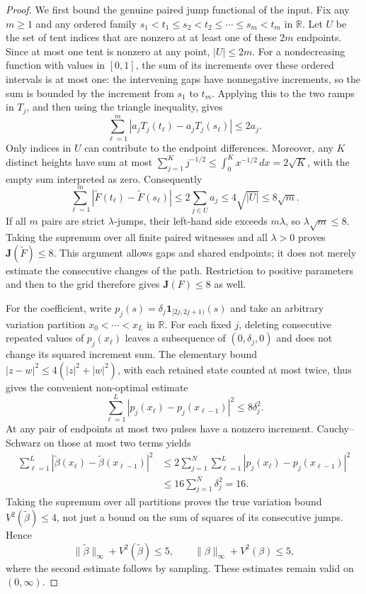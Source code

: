 \documentclass[11pt]{article}
\numberwithin{equation}{section}
\theoremstyle{remark}
\theoremstyle{definition}
\begin{document}
\begin{proof}
We first bound the genuine paired jump functional of the input.
Fix any $m\ge1$ and any ordered family
$s_1<t_1\le s_2<t_2\le\cdots\le s_m<t_m$ in $\mathbb R$.
Let $U$ be the set of tent indices that are nonzero at at least one of
these $2m$ endpoints.  Since at most one tent is nonzero at any point,
$|U|\le2m$.  For a nondecreasing function with values in $[0,1]$,
the sum of its increments over these ordered intervals is at most one:
the intervening gaps have nonnegative increments, so the sum is bounded
by the increment from $s_1$ to $t_m$.  Applying this to the two ramps in
$T_j$, and then using the triangle inequality, gives
\[
 \sum_{\ell=1}^m
 |a_jT_j(t_\ell)-a_jT_j(s_\ell)|\le2a_j.
\]
Only indices in $U$ can contribute to the endpoint differences.
Moreover, any $K$ distinct heights have sum at most
$\sum_{j=1}^Kj^{-1/2}\le\int_0^Kx^{-1/2}\,dx=2\sqrt K$,
with the empty sum interpreted as zero.  Consequently
\[
 \sum_{\ell=1}^m
 |\widetilde F(t_\ell)-\widetilde F(s_\ell)|
 \le2\sum_{j\in U}a_j
 \le4\sqrt{|U|}\le8\sqrt m.
\]
If all $m$ pairs are strict $\lambda$-jumps, their left-hand side
exceeds $m\lambda$, so $\lambda\sqrt m\le8$.
Taking the supremum over all finite paired witnesses and all
$\lambda>0$ proves $\mathbf J(\widetilde F)\le8$.
This argument allows gaps and shared endpoints; it does not merely
estimate the consecutive changes of the path.  Restriction to positive
parameters and then to the grid therefore gives $\mathbf J(F)\le8$
as well.

For the coefficient, write
$p_j(s)=\delta_j\mathbf1_{[2j,2j+1)}(s)$ and take an arbitrary
variation partition $x_0<\cdots<x_L$ in $\mathbb R$.
For each fixed $j$, deleting consecutive repeated values of
$p_j(x_\ell)$ leaves a subsequence of $(0,\delta_j,0)$ and does
not change its squared increment sum.  The elementary bound
$|z-w|^2\le4(|z|^2+|w|^2)$, with each retained state counted at
most twice, thus gives the convenient non-optimal estimate
\[
 \sum_{\ell=1}^L
 |p_j(x_\ell)-p_j(x_{\ell-1})|^2\le8\delta_j^2.
\]
At any pair of endpoints at most two pulses have a nonzero
increment.  Cauchy--Schwarz on those at most two terms yields
\[
 \begin{split}
 \sum_{\ell=1}^L
 |\widetilde\beta(x_\ell)-\widetilde\beta(x_{\ell-1})|^2
 &\le2\sum_{j=1}^N\sum_{\ell=1}^L
 |p_j(x_\ell)-p_j(x_{\ell-1})|^2\\
 &\le16\sum_{j=1}^N\delta_j^2=16.
 \end{split}
\]
Taking the supremum over all partitions proves the true variation
bound $V^2(\widetilde\beta)\le4$, not just a bound on the sum of
squares of its consecutive jumps.  Hence
\[
 \|\widetilde\beta\|_\infty+V^2(\widetilde\beta)\le5,
 \qquad \|\beta\|_\infty+V^2(\beta)\le5,
\]
where the second estimate follows by sampling.  These estimates remain
valid on $(0,\infty)$.


\end{proof}
\end{document}
